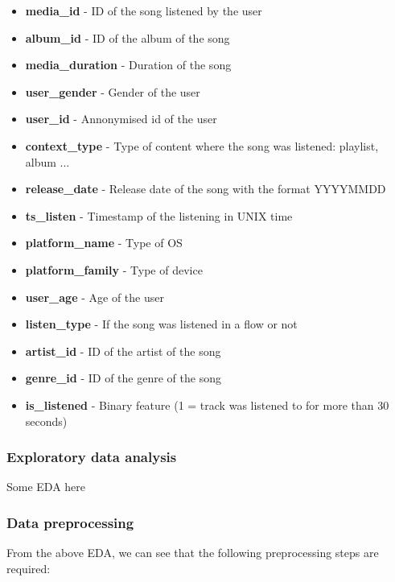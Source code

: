 \documentclass[
]{ceurart}
\begin{document}
\begin{itemize}
    \item \textbf{media\_id} - ID of the song listened by the user
    \item \textbf{album\_id} - ID of the album of the song
    \item \textbf{media\_duration} - Duration of the song
    \item \textbf{user\_gender} - Gender of the user
    \item \textbf{user\_id} - Annonymised id of the user
    \item \textbf{context\_type} - Type of content where the song was listened: playlist, album ...
    \item \textbf{release\_date} - Release date of the song with the format YYYYMMDD
    \item \textbf{ts\_listen} - Timestamp of the listening in UNIX time
    \item \textbf{platform\_name} - Type of OS
    \item \textbf{platform\_family} - Type of device
    \item \textbf{user\_age} - Age of the user
    \item \textbf{listen\_type} - If the song was listened in a flow or not
    \item \textbf{artist\_id} - ID of the artist of the song
    \item \textbf{genre\_id} - ID of the genre of the song
    \item \textbf{is\_listened} - Binary feature (1 = track was listened to for more than 30 seconds)
\end{itemize}


\subsubsection{Exploratory data analysis}
Some EDA here

\subsubsection{Data preprocessing}
From the above EDA, we can see that the following preprocessing steps are required:
\end{document}
